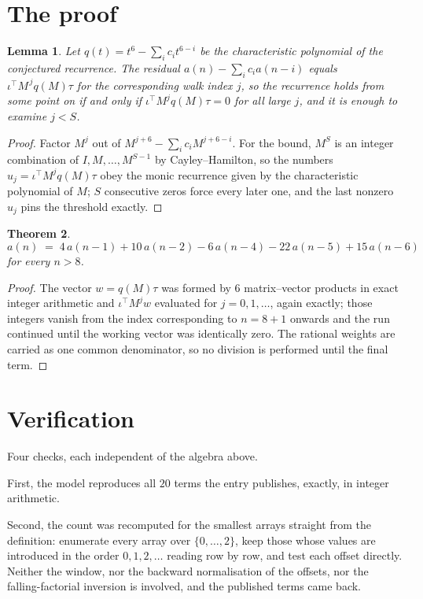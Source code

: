 \documentclass[11pt,a4paper]{article}
\theoremstyle{plain}
\newtheorem{theorem}{Theorem}
\newtheorem{lemma}[theorem]{Lemma}
\theoremstyle{definition}
\begin{document}
\section{The proof}

\begin{lemma}\label{lem:crit}
Let $q(t)=t^{6}-\sum_i c_it^{6-i}$ be the characteristic polynomial of the
conjectured recurrence. The residual $a(n)-\sum_ic_ia(n-i)$ equals
$\iota^{\!\top}M^{\,j}q(M)\tau$ for the corresponding walk index $j$, so the recurrence
holds from some point on if and only if $\iota^{\!\top}M^{j}q(M)\tau=0$ for all large $j$,
and it is enough to examine $j<S$.
\end{lemma}

\begin{proof}
Factor $M^{j}$ out of $M^{j+6}-\sum_ic_iM^{j+6-i}$. For the bound, $M^{S}$
is an integer combination of $I,M,\dots,M^{S-1}$ by Cayley--Hamilton, so the numbers
$u_j=\iota^{\!\top}M^{j}q(M)\tau$ obey the monic recurrence given by the characteristic
polynomial of $M$; $S$ consecutive zeros force every later one, and the last nonzero $u_j$
pins the threshold exactly.
\end{proof}

\begin{theorem}
\[
a(n)\;=\;4\,a(n-1) + 10\,a(n-2) - 6\,a(n-4) - 22\,a(n-5) + 15\,a(n-6)
\]
for every $n>8$.
\end{theorem}

\begin{proof}
The vector $w=q(M)\tau$ was formed by $6$ matrix--vector products in exact integer
arithmetic and $\iota^{\!\top}M^{j}w$ evaluated for $j=0,1,\dots$, again exactly; those
integers vanish from the index corresponding to $n=8+1$ onwards and the run continued
until the working vector was identically zero. The rational weights are carried as one common
denominator, so no division is performed until the final term.
\end{proof}

\section{Verification}

Four checks, each independent of the algebra above.

First, the model reproduces all $20$ terms the entry publishes, exactly, in integer
arithmetic.

Second, the count was recomputed for the smallest arrays straight from the definition:
enumerate every array over $\{0,\dots,2\}$, keep those whose values are introduced in the
order $0,1,2,\dots$ reading row by row, and test each offset directly. Neither the window, nor
the backward normalisation of the offsets, nor the falling-factorial inversion is involved, and
the published terms came back.
\end{document}
